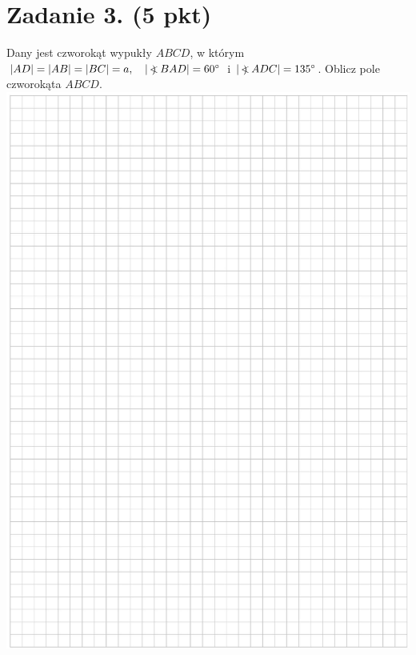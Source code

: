 \documentclass[10pt]{article}
\newcommand\Varangle{\mathop{{<\!\!\!\!\!\text{\small)}}\:}\nolimits}
\begin{document}
\section*{Zadanie 3. (5 pkt)}
Dany jest czworokąt wypukły \(A B C D\), w którym \(|A D|=|A B|=|B C|=a, \quad|\Varangle B A D|=60^{\circ}\) i \(|\Varangle A D C|=135^{\circ}\). Oblicz pole czworokąta \(A B C D\).\\
\includegraphics[max width=\textwidth, center]{2024_11_21_7379bf55d75dd0fc4c58g-06}\\
\end{document}
